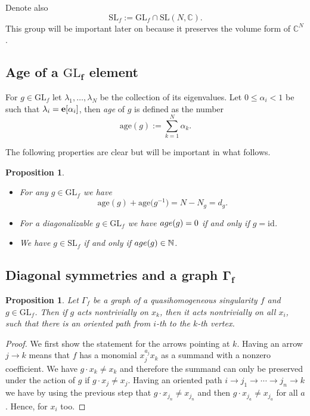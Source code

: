 \documentclass[10pt,a4paper]{article}
\numberwithin{equation}{section}
\newtheorem{Proposition}[Theorem]{Proposition}
 { \theoremstyle{definition}
\newtheorem{Definition}[Theorem]{Definition}
\newtheorem{Note}[Theorem]{Note}
\newtheorem{Example}[Theorem]{Example}
\newtheorem{Remark}[Theorem]{Remark} }
\newcommand{\CC}{{\mathbb{C}}}
\newcommand{\NN}{{\mathbb{N}}}
\newcommand{\SL}{{\mathrm{SL}}}
\newcommand{\GL}{{\mathrm{GL}}}
\newcommand{\epi}{{\bf e}}
\newcommand{\id}{\mathrm{id}}
\newcommand{\age}{\mathrm{age}}
\begin{document}
Denote also
\[
\SL_f:=\GL_f\cap\SL(N,\CC).
\]
This group will be important later on because it preserves the volume form of $\CC^N$.

\subsection[Age of a GL\_f element]{Age of a $\boldsymbol{\GL_f}$ element}

For $g\in \GL_f$ let $\lambda_1,\ldots,\lambda_N$ be the collection of its eigenvalues. Let $0\le \alpha_i < 1$ be such that $\lambda_i=\epi[\alpha_i]$, then {\em age} of $g$ is defined as the number
\begin{equation*}%
\age(g) := \sum_{k=1}^N \alpha_k.
\end{equation*}

The following properties are clear but will be important in what follows.

\begin{Proposition}\label{prop: integral age}\quad
\begin{itemize}\itemsep=0pt
\item[$(1)$] For any $g \in \GL_f$ we have
\begin{equation}\label{eq: age g and inverse}
		\age(g) + \age\bigl(g^{-1}\bigr) = N - N_g = d_g.
\end{equation}

\item[$(2)$] For a diagonalizable $g\in \GL_f$ we have ${\rm age}(g) = 0$ if and only if $g = \id$.

\item[$(3)$] We have $g\in \SL_f$ if and only if ${\rm age}(g)\in\NN$.
\end{itemize}
\end{Proposition}

\subsection[Diagonal symmetries and a graph Gamma\_f]{Diagonal symmetries and a graph $\boldsymbol{\Gamma_f}$}

\begin{Proposition}\label{prop: group elements on graph}
	Let $\Gamma_f$ be a graph of a quasihomogeneous singularity $f$ and $g \in \GL_f$. Then if $g$ acts nontrivially on $x_k$, then it acts nontrivially on all $x_i$, such that there is an oriented path from $i$-th to the $k$-th vertex.
\end{Proposition}
\begin{proof}
 We first show the statement for the arrows pointing at $k$.
 Having an arrow $j \to k$ means that $f$ has a monomial $x_j^{a_j}x_k$ as a summand with a nonzero coefficient. We have $g \cdot x_k \neq x_k$ and therefore the summand can only be preserved under the action of $g$ if $g\cdot x_j \neq x_j$. Having an oriented path $i \to j_1 \to \cdots \to j_n \to k$ we have by using the previous step that $g \cdot x_{j_n} \neq x_{j_n}$ and then $g \cdot x_{j_a} \neq x_{j_a}$ for all $a$. Hence, for $x_i$ too.
\end{proof}
\end{document}
